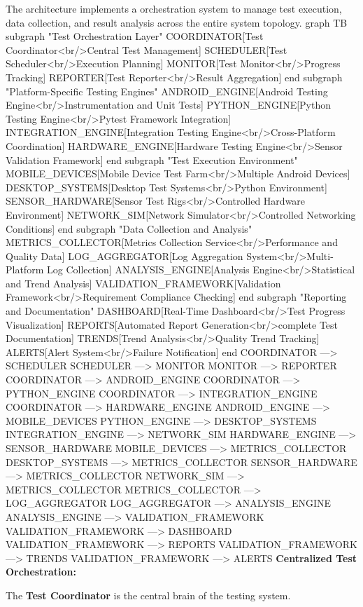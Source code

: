 {{The architecture implements a orchestration system to manage test
execution, data collection, and result analysis across the entire system topology.
graph TB subgraph "Test Orchestration Layer" COORDINATOR[Test Coordinator<br/>Central
Test Management] SCHEDULER[Test Scheduler<br/>Execution Planning] MONITOR[Test
Monitor<br/>Progress Tracking] REPORTER[Test Reporter<br/>Result Aggregation] end
subgraph "Platform-Specific Testing Engines" ANDROID\_ENGINE[Android Testing
Engine<br/>Instrumentation and Unit Tests] PYTHON\_ENGINE[Python Testing
Engine<br/>Pytest Framework Integration] INTEGRATION\_ENGINE[Integration Testing
Engine<br/>Cross-Platform Coordination] HARDWARE\_ENGINE[Hardware Testing
Engine<br/>Sensor Validation Framework] end subgraph "Test Execution Environment"
MOBILE\_DEVICES[Mobile Device Test Farm<br/>Multiple Android Devices]
DESKTOP\_SYSTEMS[Desktop Test Systems<br/>Python Environment] SENSOR\_HARDWARE[Sensor
Test Rigs<br/>Controlled Hardware Environment] NETWORK\_SIM[Network
Simulator<br/>Controlled Networking Conditions] end subgraph "Data Collection and
Analysis" METRICS\_COLLECTOR[Metrics Collection Service<br/>Performance and Quality
Data] LOG\_AGGREGATOR[Log Aggregation System<br/>Multi-Platform Log Collection]
ANALYSIS\_ENGINE[Analysis Engine<br/>Statistical and Trend Analysis]
VALIDATION\_FRAMEWORK[Validation Framework<br/>Requirement Compliance Checking] end
subgraph "Reporting and Documentation" DASHBOARD[Real-Time Dashboard<br/>Test
Progress Visualization] REPORTS[Automated Report Generation<br/>complete Test
Documentation] TRENDS[Trend Analysis<br/>Quality Trend Tracking] ALERTS[Alert
System<br/>Failure Notification] end COORDINATOR ---> SCHEDULER SCHEDULER --->
MONITOR MONITOR ---> REPORTER COORDINATOR ---> ANDROID\_ENGINE COORDINATOR --->
PYTHON\_ENGINE COORDINATOR ---> INTEGRATION\_ENGINE COORDINATOR ---> HARDWARE\_ENGINE
ANDROID\_ENGINE ---> MOBILE\_DEVICES PYTHON\_ENGINE ---> DESKTOP\_SYSTEMS
INTEGRATION\_ENGINE ---> NETWORK\_SIM HARDWARE\_ENGINE ---> SENSOR\_HARDWARE
MOBILE\_DEVICES ---> METRICS\_COLLECTOR DESKTOP\_SYSTEMS ---> METRICS\_COLLECTOR
SENSOR\_HARDWARE ---> METRICS\_COLLECTOR NETWORK\_SIM ---> METRICS\_COLLECTOR
METRICS\_COLLECTOR ---> LOG\_AGGREGATOR LOG\_AGGREGATOR ---> ANALYSIS\_ENGINE
ANALYSIS\_ENGINE ---> VALIDATION\_FRAMEWORK VALIDATION\_FRAMEWORK ---> DASHBOARD
VALIDATION\_FRAMEWORK ---> REPORTS VALIDATION\_FRAMEWORK ---> TRENDS
VALIDATION\_FRAMEWORK ---> ALERTS \textbf{Centralized Test Orchestration:}

The \textbf{Test Coordinator}
 is the central brain of the testing system.

}}
